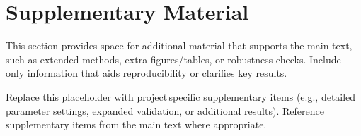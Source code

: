 \section{Supplementary Material}

\noindent This section provides space for additional material that supports the main text, such as extended methods, extra figures/tables, or robustness checks. Include only information that aids reproducibility or clarifies key results.

\noindent Replace this placeholder with project\,specific supplementary items (e.g., detailed parameter settings, expanded validation, or additional results). Reference supplementary items from the main text where appropriate.